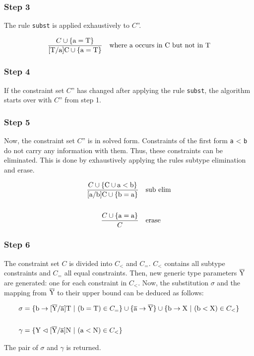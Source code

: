 \subsubsection{Step 3}
The rule \verb|subst| is applied exhaustively to $C$''.

\begin{align*}
    \frac{C \cup \{ \text{a} = \text{T} \}}{ \text{[T/a]C} \cup \{ \text{a} = \text{T} \} } \quad \text{where a occurs in C but not in T}
\end{align*}

\subsubsection{Step 4}
If the constraint set $C$'' has changed after applying the rule \verb|subst|, the algorithm starts over with $C$'' from step 1.

\subsubsection{Step 5}
Now, the constraint set $C$'' is in solved form. Constraints of the first form \verb|a| < \verb|b| do not carry any information with them. Thus, these constraints can be eliminated.
This is done by exhaustively applying the rules subtype elimination and erase.

\begin{align*}
    \frac{C \cup \{ \text{C} \cup \text{a} < \text{b} \}}{ \text{[a/b]C} \cup \{ \text{b} = \text{a} \} } \quad &\text{sub elim}
    \\
    \\
    \frac{C \cup \{ \text{a} = \text{a} \} }{ C } \quad &\text{erase}
\end{align*}

\subsubsection{Step 6}
The constraint set $C$ is divided into $C_<$ and $C_=$. $C_<$ contains all subtype constraints and $C_=$ all equal constraints.
Then, new generic type parameters $\overline{\text{Y}}$ are generated: one for each constraint in $C_<$. Now, the substitution $\sigma$ and the mapping from $\overline{\text{Y}}$ to their upper bound can be deduced as follows:

\begin{align*}
    \sigma &= \{ \text{b} \to \tsxsn{Y}{a}{T} \ | \ (\text{b} = \text{T}) \in C_= \} \cup \{ \ot{a} \to \ot{Y} \} \cup \{ \text{b} \to \text{X} \ | \ (\text{b} < \text{X}) \in C_< \}\\
    \\
    \gamma &= \{ \text{Y} \vartriangleleft \tsxsn{Y}{a}{N} \ | \ (\text{a} < \text{N}) \in C_< \}\\
\end{align*}

The pair of $\sigma$ and $\gamma$ is returned.
